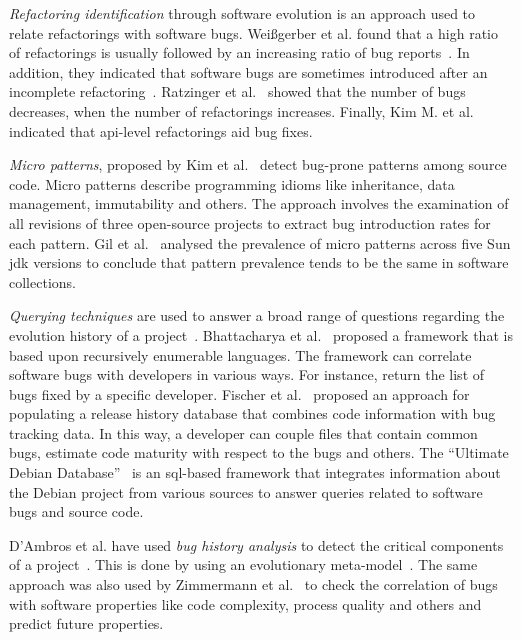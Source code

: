 \documentclass{sig-alternate}
\begin{document}
{\it Refactoring identification} through software evolution is an approach used to
relate refactorings with software bugs. Wei{\ss}gerber et al. found that a high
ratio of refactorings is usually followed by an increasing ratio of bug
reports~\cite{WD06}. In addition, they indicated that software bugs are sometimes introduced
after an incomplete refactoring~\cite{GW05}.
Ratzinger et al.~\cite{RSG08} showed that the number of bugs decreases, when the number of
refactorings increases. Finally, Kim M. et al.~\cite{KCK11} indicated that {\sc api}-level
refactorings aid bug fixes.

{\it Micro patterns}, proposed by Kim et al.~\cite{KPW06}
detect bug-prone patterns among source code. Micro patterns describe programming
idioms like inheritance, data management, immutability and others. The approach
involves the examination of all revisions of three open-source projects to extract bug
introduction rates for each pattern. Gil et al.~\cite{GM05} analysed the
prevalence of micro patterns across five Sun {\sc jdk} versions to conclude that
pattern prevalence tends to be the same in software collections.

{\it Querying techniques} are used to answer a broad range of questions
regarding the evolution history of a project~\cite{HG05}. Bhattacharya et
al.~\cite{BN11,B11} proposed a framework that is based upon
recursively enumerable languages. The framework can correlate software
bugs with developers in various ways. For instance, return the list of
bugs fixed by a specific developer. Fischer et al.~\cite{FPG03} proposed
an approach for populating a release history database that combines code
information with bug tracking data. In this way, a developer can couple files
that contain common bugs, estimate code maturity with respect to the bugs
and others. The ``Ultimate Debian Database''~\cite{NZ10} is an {\sc sql}-based
framework that integrates information about the Debian project from various
sources to answer queries related to software bugs and source code.

D'Ambros et al. have used {\it bug history analysis} to detect
the critical components of a project~\cite{D08}. This is done by using an
evolutionary meta-model~\cite{DL08}. The same approach was
also used by Zimmermann et al.~\cite{ZNA08} to check the correlation
of bugs with software properties like code complexity, process quality and others
and predict future properties.
\end{document}
